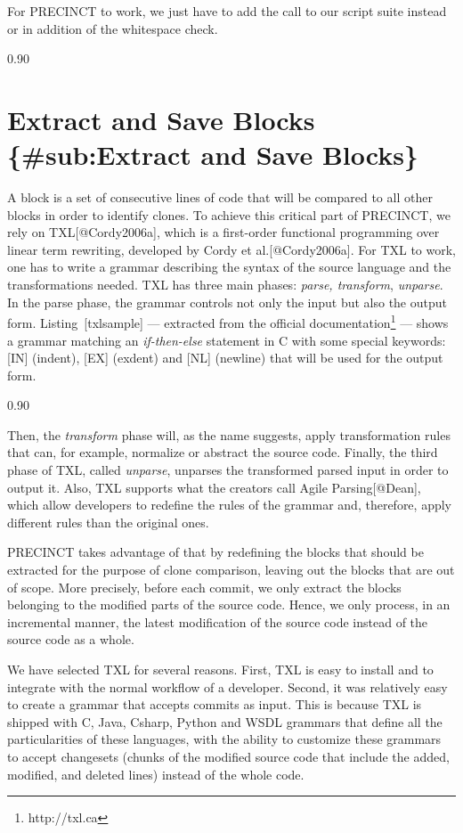 For PRECINCT to work, we just have to add the call to our script suite
instead or in addition of the whitespace check.

{0.90}

\section{Extract and Save Blocks \{\#sub:Extract and Save
Blocks\}}\label{extract-and-save-blocks-subextract-and-save-blocks}

A block is a set of consecutive lines of code that will be compared to
all other blocks in order to identify clones. To achieve this critical
part of PRECINCT, we rely on TXL{[}@Cordy2006a{]}, which is a
first-order functional programming over linear term rewriting, developed
by Cordy et al.{[}@Cordy2006a{]}. For TXL to work, one has to write a
grammar describing the syntax of the source language and the
transformations needed. TXL has three main phases: \emph{parse,
transform}, \emph{unparse}. In the parse phase, the grammar controls not
only the input but also the output form. Listing~{[}txlsample{]} ---
extracted from the official documentation\footnote{http://txl.ca} ---
shows a grammar matching an \emph{if-then-else} statement in C with some
special keywords: {[}IN{]} (indent), {[}EX{]} (exdent) and {[}NL{]}
(newline) that will be used for the output form.

{0.90}

Then, the \emph{transform} phase will, as the name suggests, apply
transformation rules that can, for example, normalize or abstract the
source code. Finally, the third phase of TXL, called \emph{unparse},
unparses the transformed parsed input in order to output it. Also, TXL
supports what the creators call Agile Parsing{[}@Dean{]}, which allow
developers to redefine the rules of the grammar and, therefore, apply
different rules than the original ones.

PRECINCT takes advantage of that by redefining the blocks that should be
extracted for the purpose of clone comparison, leaving out the blocks
that are out of scope. More precisely, before each commit, we only
extract the blocks belonging to the modified parts of the source code.
Hence, we only process, in an incremental manner, the latest
modification of the source code instead of the source code as a whole.

We have selected TXL for several reasons. First, TXL is easy to install
and to integrate with the normal workflow of a developer. Second, it was
relatively easy to create a grammar that accepts commits as input. This
is because TXL is shipped with C, Java, Csharp, Python and WSDL grammars
that define all the particularities of these languages, with the ability
to customize these grammars to accept changesets (chunks of the modified
source code that include the added, modified, and deleted lines) instead
of the whole code.

